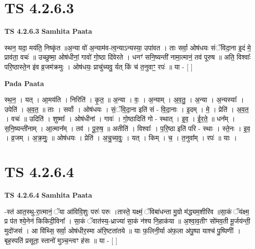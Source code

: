 \documentclass[17pt]{extarticle}
\begin{document}

\section{ TS 4.2.6.3 }

\textbf{TS 4.2.6.3 } \newline
\textbf{Samhita Paata} \newline

स्थन॒ यदा॒ मय॑ति॒ निष्कृ॑त ॥अ॒न्या वो॑ अ॒न्याम॑व-त्व॒न्याऽन्यस्या॒ उपा॑वत । ताः सर्वा॒ ओष॑धयः संॅविदा॒ना इ॒दं मे॒ प्राव॑ता॒ वचः॑ ॥ उच्छुष्मा॒ ओष॑धीनां॒ गावो॑ गो॒ष्ठा दि॑वेरते । धनꣳ॑ सनि॒ष्यन्ती॑ नामा॒त्मानं॒ तव॑ पूरुष ॥ अति॒ विश्वाः᳚ परि॒ष्ठास्ते॒न इ॑व व्र॒जम॑क्रमुः । ओष॑धयः॒ प्राचु॑च्यवु॒ र्यत् किं च॑ त॒नुवाꣳ॒॒ रपः॑ ॥ या - [  ] \newline

\textbf{Pada Paata} \newline

स्थ॒न॒ । यत् । आ॒मय॑ति । निरिति॑ । कृ॒त॒ ॥ अ॒न्या । वः॒ । अ॒न्याम् । अ॒व॒तु॒ । अ॒न्या । अ॒न्यस्याः᳚ । उपेति॑ । अ॒व॒त॒ ॥ ताः । सर्वाः᳚ । ओष॑धयः । सं॒ॅवि॒दा॒ना इति॑ सं - वि॒दा॒नाः । इ॒दम् । मे॒ । प्रेति॑ । अ॒व॒त॒ । वचः॑ ॥ उदिति॑ । शुष्माः᳚ । ओष॑धीनां । गावः॑ । गो॒ष्ठादिति॑ गो - स्थात् । इ॒व॒ । ई॒र॒ते॒ ॥ धन᳚म् । स॒नि॒ष्यन्ती॑नाम् । आ॒त्मान᳚म् । तव॑ । पू॒रु॒ष॒ ॥ अतीति॑ । विश्वाः᳚ । प॒रि॒ष्ठा इति॑ परि - स्थाः । स्ते॒नः । इ॒व॒ । व्र॒जम् । अ॒क्र॒मुः॒ ॥ ओष॑धयः । प्रेति॑ । अ॒चु॒च्य॒वुः॒ । यत् । किम् । च॒ । त॒नुवा᳚म् । रपः॑ ॥ याः ।  \newline





\section{ TS 4.2.6.4 }

\textbf{TS 4.2.6.4 } \newline
\textbf{Samhita Paata} \newline

-स्त॑ आत॒स्थु-रा॒त्मानं॒ ॅया आ॑विवि॒शुः परुः॑ परुः ।तास्ते॒ यक्ष्मं॒ ॅविबा॑धन्ता मु॒ग्रो म॑द्ध्यम॒शीरि॑व ॥सा॒कं ॅय॑क्ष्म॒ प्र प॑त श्ये॒नेन॑ किकिदी॒विना᳚ । सा॒कं ॅवात॑स्य॒-ध्राज्या॑ सा॒कं न॑श्य नि॒हाक॑या ॥ अ॒श्वा॒व॒तीꣳ सो॑मव॒ती मू॒र्जय॑न्ती॒ मुदो॑जसं । आ वि॑थ्सि॒ सर्वा॒ ओष॑धीर॒स्मा अ॑रि॒ष्टता॑तये ॥ याः फ॒लिनी॒र्या अ॑फ॒ला अ॑पु॒ष्पा याश्च॑ पु॒ष्पिणीः᳚ । बृह॒स्पति॑ प्रसूता॒ स्तानो॑ मुञ्च॒न्त्वꣳ ह॑सः ॥ या - [  ] \newline
\end{document}
